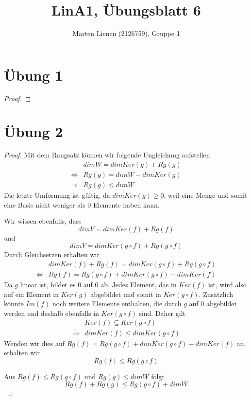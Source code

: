 \documentclass[a4paper,10pt]{article}
\title{LinA1, Übungsblatt 6}
\author{Marten Lienen (2126759), Gruppe 1}
\begin{document}
\maketitle

\section*{Übung 1}

\begin{proof}
 
\end{proof}

\section*{Übung 2}

\begin{proof}
 Mit dem Rangsatz können wir folgende Ungleichung aufstellen
 \begin{align*}
  & dim W = dim Ker(g) + Rg(g)\\
  \Leftrightarrow & Rg(g) = dim W - dim Ker(g)\\
  \Rightarrow & Rg(g) \le dim W
 \end{align*}
 Die letzte Umformung ist gültig, da $dim Ker(g) \ge 0$, weil eine Menge und somit eine Basis nicht weniger als $0$ Elemente haben kann.
 
 Wir wissen ebenfalls, dass
 \begin{equation}
  dim V = dim Ker(f) + Rg(f)
 \end{equation}
 und
 \begin{equation}
  dim V = dim Ker(g \circ f) + Rg(g \circ f)
 \end{equation}
 Durch Gleichsetzen erhalten wir
 \begin{align*}
  & dim Ker(f) + Rg(f) = dim Ker(g \circ f) + Rg(g \circ f)\\
  \Leftrightarrow & Rg(f) = Rg(g \circ f) + dim Ker(g \circ f) - dim Ker(f)
 \end{align*}
 Da $g$ linear ist, bildet es $0$ auf $0$ ab.
 Jedes Element, das in $Ker(f)$ ist, wird also auf ein Element in $Ker(g)$ abgebildet und somit in $Ker(g \circ f)$.
 Zusätzlich könnte $Im(f)$ noch weitere Elemente enthalten, die durch $g$ auf $0$ abgebildet werden und deshalb ebenfalls in $Ker(g \circ f)$ sind.
 Daher gilt
 \begin{align}
  & Ker(f) \subseteq Ker(g \circ f)\\
  \Rightarrow & dim Ker(f) \le dim Ker(g \circ f)
 \end{align}
 Wenden wir dies auf $Rg(f) = Rg(g \circ f) + dim Ker(g \circ f) - dim Ker(f)$ an, erhalten wir
 \begin{equation}
  Rg(f) \le Rg(g \circ f)
 \end{equation}

 Aus $Rg(f) \le Rg(g \circ f)$ und $Rg(g) \le dim W$ folgt
 \begin{equation}
  Rg(f) + Rg(g) \le Rg(g \circ f) + dim W
 \end{equation}
\end{proof}
\end{document}
